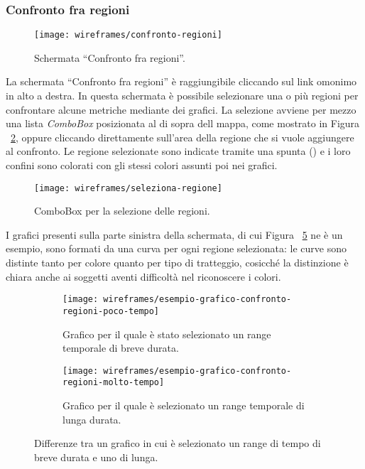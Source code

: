 \documentclass[../../../main.tex]{subfiles}
\begin{document}
\subsubsection{Confronto fra regioni}\label{ss:confronto-fra-regioni}
\begin{figure}[H]
    \centering
    \texttt{[image: wireframes/confronto-regioni]}
    \caption{Schermata ``Confronto fra regioni''.}
    \label{fig:confronto-regioni}
\end{figure}
La schermata ``Confronto fra regioni'' è raggiungibile cliccando sul link omonimo in alto a destra. In questa schermata è possibile selezionare una o più regioni per confrontare alcune metriche mediante dei grafici. La selezione avviene per mezzo una lista \textit{ComboBox} posizionata al di sopra dell mappa, come mostrato in Figura ~\ref{fig:seleziona-regione}, oppure cliccando direttamente sull'area della regione che si vuole aggiungere al confronto. Le regione selezionate sono indicate tramite una spunta (\checkmark) e i loro confini sono colorati con gli stessi colori assunti poi nei grafici.

\begin{figure}[H]
    \centering
    \texttt{[image: wireframes/seleziona-regione]}
    \caption{ComboBox per la selezione delle regioni.}
    \label{fig:seleziona-regione}
\end{figure}

I grafici presenti sulla parte sinistra della schermata, di cui Figura ~\ref{fig:esempio-grafico-confronto-regioni} ne è un esempio, sono formati da una curva per ogni regione selezionata: le curve sono distinte tanto per colore quanto per tipo di tratteggio, cosicché la distinzione è chiara anche ai soggetti aventi difficoltà nel riconoscere i colori.

\begin{figure}[H]
    \begin{subfigure}[b]{0.5\textwidth}
        \centering
        \texttt{[image: wireframes/esempio-grafico-confronto-regioni-poco-tempo]}
        \caption{Grafico per il quale è stato selezionato un range temporale di breve durata.}
        \label{fig:esempio-grafico-confronto-regioni-poco-tempo}
    \end{subfigure}
\hfill
    \begin{subfigure}[b]{0.45\textwidth}
        \centering
        \texttt{[image: wireframes/esempio-grafico-confronto-regioni-molto-tempo]}
        \caption{Grafico per il quale è selezionato un range temporale di lunga durata.}\label{fig:esempio-grafico-confronto-regioni-molto-tempo}
    \end{subfigure}
    \caption{Differenze tra un grafico in cui è selezionato un range di tempo di breve durata e uno di lunga.}
    \label{fig:esempio-grafico-confronto-regioni}
\end{figure}
\clearpage
\end{document}
